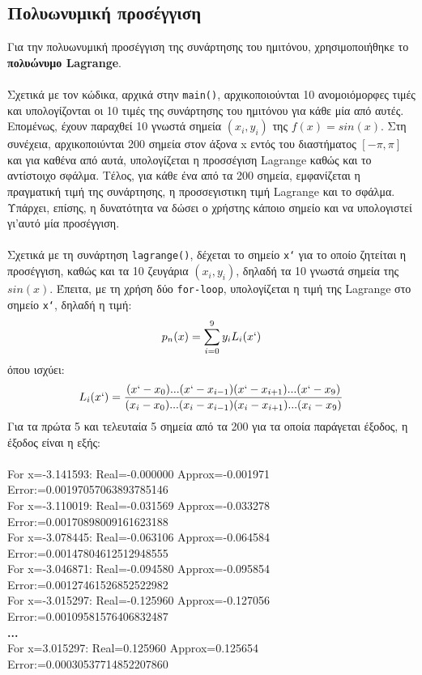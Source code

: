 \documentclass[a4paper, 14pt]{article}   %
\begin{document}
\subsection*{Πολυωνυμική προσέγγιση}   %
	Για την πολυωνυμική προσέγγιση της συνάρτησης του ημιτόνου, χρησιμοποιήθηκε το \textbf{πολυώνυμο Lagrange}.\\\\
Σχετικά με τον κώδικα, αρχικά στην \texttt{main()}, αρχικοποιούνται 10 ανομοιόμορφες τιμές και υπολογίζονται οι 10 τιμές της συνάρτησης του ημιτόνου για κάθε μία από αυτές. Επομένως, έχουν παραχθεί 10 γνωστά σημεία $(x_i, y_i)$ της $f(x) = sin(x)$. Στη συνέχεια, αρχικοποιύνται 200 σημεία στον άξονα x εντός του διαστήματος $[-\pi, \pi]$ και για καθένα από αυτά, υπολογίζεται η προσσέγιση Lagrange καθώς και το αντίστοιχο σφάλμα. Τέλος, για κάθε ένα από τα 200 σημεία, εμφανίζεται η πραγματική τιμή της συνάρτησης, η προσσεγιστικη τιμή Lagrange και το σφάλμα. Υπάρχει, επίσης, η δυνατότητα να δώσει ο χρήστης κάποιο σημείο και να υπολογιστεί γι'αυτό μία προσέγγιση.\\\\
Σχετικά με τη συνάρτηση \texttt{lagrange()}, δέχεται το σημείο \texttt{x`} για το οποίο ζητείται η προσέγγιση, καθώς και τα 10 ζευγάρια $(x_i, y_i)$, δηλαδή τα 10 γνωστά σημεία της $sin(x)$. Έπειτα, με τη χρήση δύο \texttt{for-loop}, υπολογίζεται η τιμή της Lagrange στο σημείο \texttt{x`}, δηλαδή η τιμή:\\
$$p_n(x) = \sum_{i=0}^{9} y_iL_i(x`)$$ όπου ισχύει: $$L_i(x`) = \frac{(x`-x_0)...(x`-x_{i-1})(x`-x_{i+1})...(x`-x_9)}{(x_i-x_0)...(x_i-x_{i-1})(x_i-x_{i+1})...(x_i-x_9)}$$ Για τα πρώτα 5 και τελευταία 5 σημεία από τα 200 για τα οποία παράγεται έξοδος, η έξοδος είναι η εξής:\\\\
For x=-3.141593: Real=-0.000000 Approx=-0.001971 Error:=0.00197057063893785146\\
For x=-3.110019: Real=-0.031569 Approx=-0.033278 Error:=0.00170898009161623188\\
For x=-3.078445: Real=-0.063106 Approx=-0.064584 Error:=0.00147804612512948555\\
For x=-3.046871: Real=-0.094580 Approx=-0.095854 Error:=0.00127461526852522982\\
For x=-3.015297: Real=-0.125960 Approx=-0.127056 Error:=0.00109581576406832487\\
{\large\textbf{...}}\\
For x=3.015297: Real=0.125960 Approx=0.125654 Error:=0.00030537714852207860\\
\end{document}
